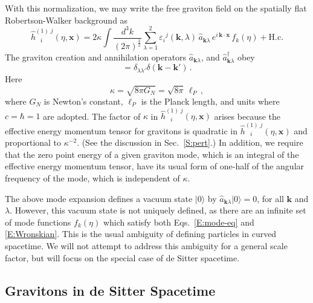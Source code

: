 \documentclass[preprint,prd,showpacs,superscriptaddress]{revtex4}
\begin{document}
With this normalization, we may write the free graviton field on the spatially flat Robertson-Walker background as
\begin{equation}\label{E:grav-field}
\hat{h}^{(1)\;j}_{\;\;\; i}(\eta,\mathbf{x})=2\kappa\int\!\frac{d^{3}k}{(2\pi)^{\frac{3}{2}}}
\sum_{\lambda=1}^{2}\varepsilon_{i}{}^{j}(\mathbf{k},\lambda)\,\hat{a}_{\mathbf{k}\lambda}\,e^{i\,\mathbf{k}\cdot\mathbf{x}}
\,f_k(\eta)+\text{H.c.}
\end{equation}
The graviton creation and annihilation operators $\hat{a}_{\mathbf{k}\lambda}$, and
 $\hat{a}_{\mathbf{k}\lambda}^{\dagger}$ obey
\begin{equation}
	[\hat{a}_{\mathbf{k}\lambda}^{\vphantom{\dagger}},\hat{a}_{\mathbf{k}'\lambda'}^{\dagger}]=
	\delta_{\lambda\lambda'}\delta(\mathbf{k}-\mathbf{k}')\,.
\end{equation}
Here
\begin{equation}
\kappa = \sqrt{8 \pi G_N} = \sqrt{8 \pi}\, \ell_P \,, 
\label{E:kappa}
\end{equation}
where $G_N$ is Newton's constant, $\ell_P$ is the Planck length, and units where $c=\hbar=1$ are adopted.
 The factor of $\kappa$ in 
$\hat{h}^{(1)\;j}_{\;\;\; i}(\eta,\mathbf{x})$ arises because the effective energy momentum tensor for gravitons is
quadratic in $\hat{h}^{(1)\;j}_{\;\;\; i}(\eta,\mathbf{x})$ and proportional to $\kappa^{-2}$. (See the discussion in Sec.~\ref{S:pert}.) 
In addition, we require that the zero point energy of a given graviton mode, which is an integral of the  effective energy momentum 
tensor, have its usual form of one-half of the angular frequency of the mode, which is independent of $\kappa$. 

The above mode expansion defines a vacuum state $|0\rangle$ by $\hat{a}_{\mathbf{k}\lambda}|0\rangle =0$, 
for all $\mathbf{k}$ and $\lambda$. However, this vacuum state is not uniquely defined, as there are an infinite
set of mode functions $f_k(\eta)$ which satisfy both Eqs.~\eqref{E:mode-eq} and \eqref{E:Wronskian}. This is
the usual ambiguity of defining particles in curved spacetime. We will not attempt to address this ambiguity for a 
general scale factor, but will focus on the special case of de Sitter spacetime.

\subsection{Gravitons in de Sitter Spacetime}
 
\end{document}

